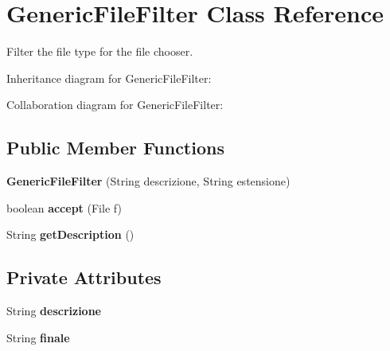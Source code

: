 \hypertarget{class_generic_file_filter}{\section{Generic\-File\-Filter Class Reference}
\label{class_generic_file_filter}
}


Filter the file type for the file chooser.  




Inheritance diagram for Generic\-File\-Filter\-:


Collaboration diagram for Generic\-File\-Filter\-:
\subsection*{Public Member Functions}
\begin{DoxyCompactItemize}
\item 
\hypertarget{class_generic_file_filter_a96d78c6c212bfbf0be95a4d10937a89d}{{\bfseries Generic\-File\-Filter} (String descrizione, String estensione)}\label{class_generic_file_filter_a96d78c6c212bfbf0be95a4d10937a89d}

\item 
\hypertarget{class_generic_file_filter_a03eee4e0d87525559746265dc63c9319}{boolean {\bfseries accept} (File f)}\label{class_generic_file_filter_a03eee4e0d87525559746265dc63c9319}

\item 
\hypertarget{class_generic_file_filter_a6918acbc60f5dcff51cb92a9487e2493}{String {\bfseries get\-Description} ()}\label{class_generic_file_filter_a6918acbc60f5dcff51cb92a9487e2493}

\end{DoxyCompactItemize}
\subsection*{Private Attributes}
\begin{DoxyCompactItemize}
\item 
\hypertarget{class_generic_file_filter_a9953e3b3aa3dee91452cb9c2ad80822b}{String {\bfseries descrizione}}\label{class_generic_file_filter_a9953e3b3aa3dee91452cb9c2ad80822b}

\item 
\hypertarget{class_generic_file_filter_a9468f04e6ea80d41e6bc69b59769b751}{String {\bfseries finale}}\label{class_generic_file_filter_a9468f04e6ea80d41e6bc69b59769b751}

\end{DoxyCompactItemize}


